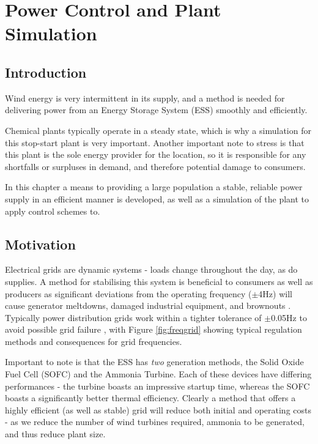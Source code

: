
\section{Power Control and Plant Simulation}
\label{sec:powercontrol}
\subsection{Introduction}
\label{sec:pwrintro}

Wind energy is very intermittent in its supply, and a method is needed for delivering power from an Energy Storage System (ESS) smoothly and efficiently.

Chemical plants typically operate in a steady state, which is why a simulation for this stop-start plant is very important.
Another important note to stress is that this plant is the sole energy provider for the location, so it is responsible for any shortfalls or surpluses in demand, and therefore potential damage to consumers.

In this chapter a means to providing a large population a stable, reliable power supply in an efficient manner is developed, as well as a simulation of the plant to apply control schemes to.

\subsection{Motivation}

Electrical grids are dynamic systems - loads change throughout the day, as do supplies.
A method for stabilising this system is beneficial to consumers as well as producers as significant deviations from the operating frequency ($\pm$4Hz) will cause generator meltdowns, damaged industrial equipment, and brownouts \cite{power:freqs}.
Typically power distribution grids work within a tighter tolerance of $\pm$0.05Hz to avoid possible grid failure \cite{power:freqs}, with Figure \ref{fig:freqgrid} showing typical regulation methods and consequences for grid frequencies.

Important to note is that the ESS has \emph{two} generation methods, the Solid Oxide Fuel Cell (SOFC) and the Ammonia Turbine.
Each of these devices have differing performances - the turbine boasts an impressive startup time, whereas the SOFC boasts a significantly better thermal efficiency.
Clearly a method that offers a highly efficient (as well as stable) grid will reduce both initial and operating costs - as we reduce the number of wind turbines required, ammonia to be generated, and thus reduce plant size.

